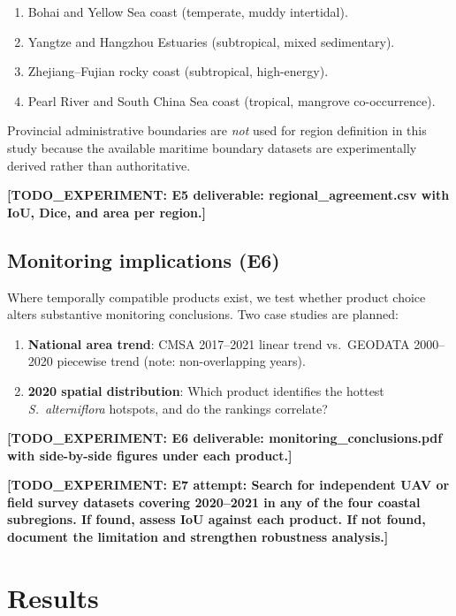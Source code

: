 \documentclass[11pt]{article}
\newcommand{\TODOEXP}[1]{\textcolor{todocolor}{\textbf{[TODO_EXPERIMENT: #1]}}}
\begin{document}
\begin{enumerate}[nosep]
\item Bohai and Yellow Sea coast (temperate, muddy intertidal).
\item Yangtze and Hangzhou Estuaries (subtropical, mixed sedimentary).
\item Zhejiang--Fujian rocky coast (subtropical, high-energy).
\item Pearl River and South China Sea coast (tropical, mangrove co-occurrence).
\end{enumerate}

Provincial administrative boundaries are \emph{not} used for region definition
in this study because the available maritime boundary datasets are
experimentally derived rather than authoritative\citep{TODO_2026_admin_warning}.

\TODOEXP{E5 deliverable: regional\_agreement.csv with IoU, Dice, and area per region.}

\subsection{Monitoring implications (E6)}

Where temporally compatible products exist, we test whether product choice alters
substantive monitoring conclusions. Two case studies are planned:

\begin{enumerate}[nosep]
\item \textbf{National area trend}: CMSA 2017--2021 linear trend vs.\ GEODATA
  2000--2020 piecewise trend (note: non-overlapping years).
\item \textbf{2020 spatial distribution}: Which product identifies the hottest
  \textit{S.~alterniflora} hotspots, and do the rankings correlate?
\end{enumerate}

\TODOEXP{E6 deliverable: monitoring\_conclusions.pdf with side-by-side figures
under each product.}

\TODOEXP{E7 attempt: Search for independent UAV or field survey datasets covering
2020--2021 in any of the four coastal subregions. If found, assess IoU against
each product. If not found, document the limitation and strengthen robustness
analysis.}

\section{Results}
\label{sec:results}
\end{document}
